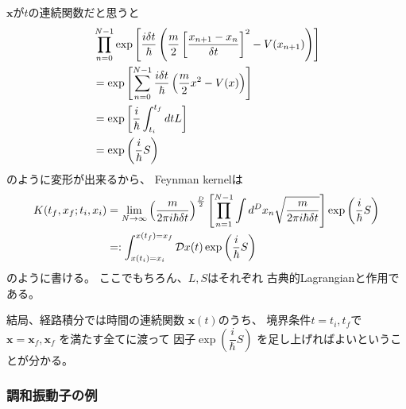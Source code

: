 $\bm{x}$が$t$の連続関数だと思うと
\begin{align}
    &
    \prod_{n=0}^{N-1}
    \exp\left[
        \dfrac{ i \delta t }{\hbar}
        \left(
            \dfrac{m}{2}
            \left[
                \dfrac{
                    x_{n+1}
                -
                    x_{n}    
                }{\delta t}
            \right]^2
        -
            V( x_{n+1} )
        \right)
    \right]
\notag\\&=
    \exp\left[
        \sum_{n=0}^{N-1}
        \dfrac{ i \delta t }{\hbar}
        \left(
            \dfrac{m}{2}
            x^2
        -
            V( x )
        \right)
    \right]
\notag\\&=
    \exp\left[
        \dfrac{ i }{\hbar}
        \int_{t_i}^{t_f} dt
        L
    \right]
\notag\\&=
    \exp\left(\dfrac{i}{\hbar}S \right)
\end{align}
のように変形が出来るから、
Feynman kernelは
\begin{align}
    K( t_f, x_f ; t_i, x_i )
    &=
    \lim_{ N \to \infty }
    \left(
        \dfrac{m}{ 2 \pi i \hbar \delta t }
    \right)^{\frac{D}{2}}
    \left[
        \prod_{n=1}^{N-1}
        \int
        d^D x_n
        \sqrt{
            \dfrac{m}{2 \pi i \hbar \delta t}
        }
    \right]
    \exp\left(\dfrac{i}{\hbar}S \right)
\notag\\&
    =:
    \int_{x(t_i) = x_i}^{x(t_f) = x_f}
        \mathcal{D} x(t)
    \exp\left(\dfrac{i}{\hbar}S \right)
\end{align}
のように書ける。
ここでもちろん、$L, S$はそれぞれ
古典的Lagrangianと作用である。

結局、経路積分では時間の連続関数
$\bm{x}(t)$のうち、
境界条件$t = t_i, t_f$で
$\bm{x} = \bm{x}_f, \bm{x}_f$
を満たす全てに渡って
因子$\exp\left(\dfrac{i}{\hbar}S \right)$
を足し上げればよいということが分かる。

\subsubsection{調和振動子の例}
\label{classical analysis of harmonic oscillator}

